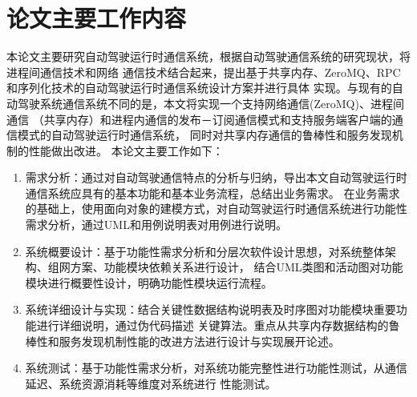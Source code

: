 \section{论文主要工作内容}
本论文主要研究自动驾驶运行时通信系统，根据自动驾驶通信系统的研究现状，将进程间通信技术和网络
通信技术结合起来，提出基于共享内存、ZeroMQ、RPC和序列化技术的自动驾驶运行时通信系统设计方案并进行具体
实现。与现有的自动驾驶系统通信系统不同的是，本文将实现一个支持网络通信(ZeroMQ)、进程间通信
（共享内存）和进程内通信的发布－订阅通信模式和支持服务端客户端的通信模式的自动驾驶运行时通信系统，
同时对共享内存通信的鲁棒性和服务发现机制的性能做出改进。
本论文主要工作如下：
\begin{enumerate}
  \item 需求分析：通过对自动驾驶通信特点的分析与归纳，导出本文自动驾驶运行时通信系统应具有的基本功能和基本业务流程，总结出业务需求。
  在业务需求的基础上，使用面向对象的建模方式，对自动驾驶运行时通信系统进行功能性需求分析，通过UML和用例说明表对用例进行说明。
  \item 系统概要设计：基于功能性需求分析和分层次软件设计思想，对系统整体架构、组网方案、功能模块依赖关系进行设计，
  结合UML类图和活动图对功能模块进行概要性设计，明确功能性模块运行流程。
  \item 系统详细设计与实现：结合关键性数据结构说明表及时序图对功能模块重要功能进行详细说明，通过伪代码描述
  关键算法。重点从共享内存数据结构的鲁棒性和服务发现机制性能的改进方法进行设计与实现展开论述。
  \item 系统测试：基于功能性需求分析，对系统功能完整性进行功能性测试，从通信延迟、系统资源消耗等维度对系统进行
  性能测试。
\end{enumerate}

